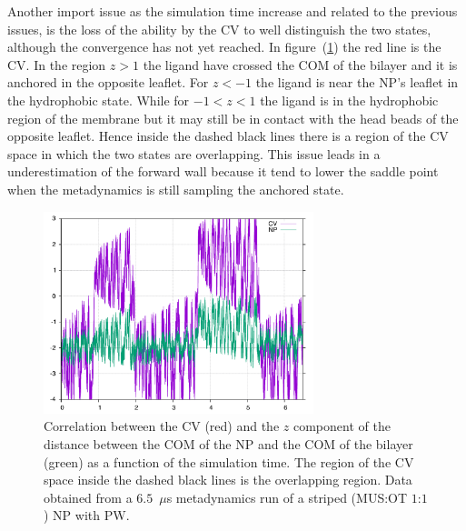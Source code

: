 Another import issue as the simulation time increase and related to the previous issues, is the loss of the ability by the \ac{CV} to well distinguish the two states, although the convergence has not yet reached. In figure~(\ref{fig:NPDist}) the red line is the \ac{CV}. In the region $z > 1$ the ligand have crossed the \ac{COM} of the bilayer and it is anchored in the opposite leaflet. For $z < -1$ the ligand is near the \ac{NP}'s leaflet in the hydrophobic state. While for $-1 < z < 1$ the ligand is in the hydrophobic region of the membrane but it may still be in contact with the head beads of the opposite leaflet. Hence inside the dashed black lines there is a region of the \ac{CV} space in which the two states are overlapping. This issue leads in a underestimation of the forward wall because it tend to lower the saddle point when the metadynamics is still sampling the anchored state.
\begin{figure}[!ht]
	\centering
	\includegraphics[width=0.7\textwidth]{./img/results/NPDistance/NPDist}
	\caption{Correlation between the \acs{CV} (red) and the $z$ component of the distance between the \acs{COM} of the \acs{NP} and the \acs{COM} of the bilayer (green) as a function of the simulation time. The region of the \acs{CV} space inside the dashed black lines is the overlapping region. Data obtained from a $6.5$~$\mu$s metadynamics run of a striped (\acs{MUS}:\acs{OT} $1$:$1$) \acs{NP} with \acs{PW}.}
	\label{fig:NPDist}
\end{figure}



